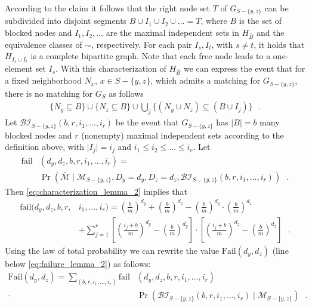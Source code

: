 \let\accentvec\vec \documentclass{llncs}
\newcommand{\degr}{\ensuremath{d}}
\newcommand{\randv}{\ensuremath{D}}
\newcommand{\cells}{\ensuremath{m}}
\newcommand{\blank}{\text{ }}
\newcommand{\graph}{\ensuremath{G}}
\newcommand{\abs}[1]{\lvert#1\rvert}
\newcommand{\bfrac}[2]{ \left(\frac{#1}{#2}\right) }
\newcommand{\evNM}{\bar{\mathcal{M}}}
\newcommand{\evM}{{\mathcal{M}}}
\newcommand{\evP}{{\mathcal{BI}}}
\newcommand{\Fail}{\mathrm{Fail}}
\newcommand{\fail}{\mathrm{fail}}
\begin{document}
\noindent According to the claim it follows that the right node set ${T}$ of $\graph_{S-\{y,z\}}$ can be subdivided into
disjoint segments $B \cup I_1 \cup I_2 \cup \ldots ={T}$, where $B$ is the set of blocked nodes and $I_1,I_2,\ldots$ are
the maximal independent sets in $H_{\bar{B}}$
and the equivalence classes of $\sim$, respectively.
For each pair $I_s,I_t$, with $s\neq t$, it holds that $H_{I_s\cup I_t}$ is a complete bipartite graph.
Note that each free node leads to a one-element set $I_s$.
With this characterization of $H_{\bar{B}}$ we can express the event that for 
a fixed neighborhood $N_x$, $x\in S-\{y,z\}$, which admits a matching for
$\graph_{S-\{y,z\}}$, there is no matching for $\graph_S$ as follows
\begin{align}
\label{eq:characterization_lemma_2}
\{ N_y \subseteq B \}  \cup  \{N_z \subseteq B\}   \cup  \bigcup_{j} \{(N_y\cup N_z) \subseteq (B\cup I_j)\}  \blank.
\end{align}
Let $\evP_{S-\{y,z\}}(b,r,i_1,\ldots,i_r)$ be the event that $\graph_{S-\{y,z\}}$
has $\abs{B}=b$ many blocked nodes and $r$ (nonempty) maximal independent sets according to the definition above,
with $\abs{I_j}=i_j$ and $i_1\leq i_2\leq \ldots\leq i_r$.
Let 
\begin{equation*}
\begin{split}
 \fail&({\degr_y},{\degr_z},b,r,i_1,\ldots,i_r)=\\
& \Pr\left( \evNM  \mid \evM_{S-\{y,z\}}, \randv_y={\degr_y}, \randv_z={\degr_z}, \evP_{S-\{y,z\}}(b,r,i_1,\ldots,i_r) \right) \blank.
\end{split}
\end{equation*}
Then \eqref{eq:characterization_lemma_2} implies that
\begin{align*}
\fail({\degr_y},{\degr_z},b,r,&i_1,\ldots,i_r)
=\bfrac{b}{\cells}^{\degr_y}  + \bfrac{b}{\cells}^{\degr_z} - \bfrac{b}{\cells}^{\degr_y} \cdot \bfrac{b}{\cells}^{\degr_z} \\
&+\sum_{j=1}^r \left[ \bfrac{i_j+b}{\cells}^{\degr_y} - \bfrac{b}{\cells}^{\degr_y} \right]\cdot 
             \left[ \bfrac{i_j+b}{\cells}^{\degr_z}  - \bfrac{b}{\cells}^{\degr_z} \right] \blank.
\end{align*}
Using the law of total probability we can rewrite the value $\Fail({\degr_y},{\degr_z})$ (line below \eqref{eq:failure_lemma_2})
as follows:
\begin{equation*}
\begin{split}
\Fail({\degr_y},{\degr_z})=\sum\limits_{(b,r,i_1,\ldots,i_r)}\fail&({\degr_y},{\degr_z},b,r,i_1,\ldots,i_r) \\[-3ex]
                                                               \cdot&  \Pr(\evP_{S-\{y,z\}}(b,r,i_1,\ldots,i_r) \mid \evM_{S-\{y,z\}}) \blank.
\end{split}
\end{equation*}
\end{document}
